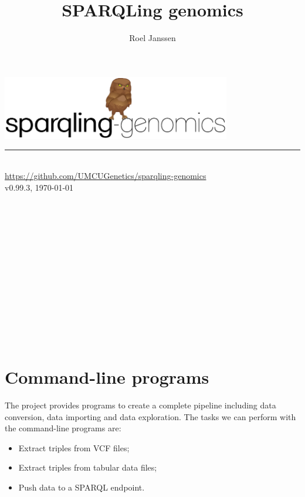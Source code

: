 \documentclass[11pt,a4paper,oneside]{book}
\title{SPARQLing genomics}
\author{Roel Janssen}
\begin{document}
\begin{titlepage}
  \vspace*{\fill}
  \begin{center}
    \includegraphics[width=0.75\textwidth]{figures/logo.pdf}
    \rule{0.75\textwidth}{1.0pt}~\\
    \url{https://github.com/UMCUGenetics/sparqling-genomics}~\\
    \large v0.99.3, \today{}
    ~\\~\\~\\~\\~\\~\\~\\~\\~\\~\\~\\~\\~\\~\\
  \end{center}
  \vspace*{\fill}

  \thispagestyle{empty}
\end{titlepage}

\setcounter{page}{1}
\hypersetup{linkcolor=black}
\tableofcontents
\newpage{}
\hypersetup{linkcolor=LinkGray}
\setcounter{page}{1}



\chapter{Command-line programs}

  The project provides programs to create a complete pipeline including
  data conversion, data importing and data exploration.  The tasks we can
  perform with the command-line programs are:
  \begin{itemize}
    \item Extract triples from VCF files;
    \item Extract triples from tabular data files;
    \item Push data to a SPARQL endpoint.
  \end{itemize}
\end{document}
